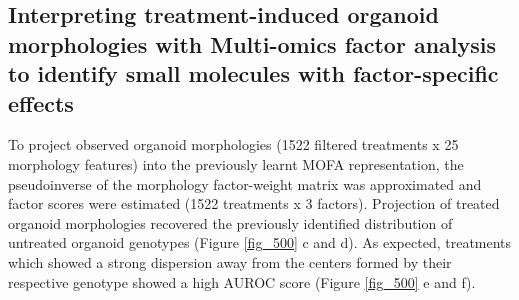 \begin{flushleft}
\newpage
\section{Interpreting treatment-induced organoid morphologies with Multi-omics factor analysis to identify small molecules with factor-specific effects}

To project observed organoid morphologies (1522 filtered treatments x 25 morphology features) into the previously learnt MOFA representation, the pseudoinverse of the morphology factor-weight matrix was approximated and factor scores were estimated (1522 treatments x 3 factors). Projection of treated organoid morphologies recovered the previously identified distribution of untreated organoid genotypes (Figure \ref{fig_500} c and d). As expected, treatments which showed a strong dispersion away from the centers formed by their respective genotype showed a high AUROC score (Figure \ref{fig_500} e and f).
\bigbreak


\end{flushleft}
